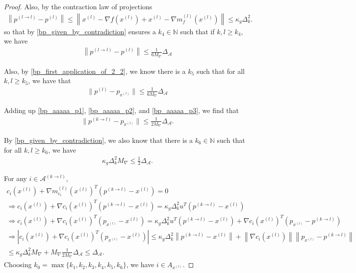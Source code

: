 \documentclass{article}
\theoremstyle{case}
\numberwithin{theorem}{subsection}
\newcommand{\dk}{\Delta_k}
\newcommand{\maxgrad}{{M_{\nabla}}}
\newcommand{\minactivegraddelta}{{\Delta_{\mathcal A}}}
\newcommand{\naturals}{\mathbb N}
\begin{document}
\begin{proof}
Also, by the contraction law of projections
\begin{align*}
\left\|p^{(l\to l)} - p^{(l)}\right\| 
\le \left\|x^{(l)} - \nabla f\left(x^{(l)}\right) + x^{(l)} - \nabla m_{f}^{(l)}\left(x^{(l)}\right)\right\|
\le \kappa_g \dk^2.
\end{align*}
so that by \cref{bp_given_by_contradiction} ensures a $k_4\in\naturals$ such that if $k, l \ge k_4$, we have
\begin{align}
\left\|p^{(l\to l)} - p^{(l)}\right\| \le \frac 1 {6\maxgrad} \minactivegraddelta \label{bp_aaaaa_p2}
\end{align}

Also, by \cref{bp_first_application_of_2_2}, we know there is a $k_5$ such that for all $k, l \ge k_5$, we have that
\begin{align}
\| p^{(l)} - p_{x^{(l)}} \| \le \frac 1 {6\maxgrad} \minactivegraddelta \label{bp_aaaaa_p3}
\end{align}

Adding up \cref{bp_aaaaa_p1}, \cref{bp_aaaaa_p2}, and \cref{bp_aaaaa_p3}, we find that
\begin{align*}
\| p^{(k\to l)} - p_{x^{(l)}} \| \le \frac 1 {2\maxgrad}\minactivegraddelta.
\end{align*}

By \cref{bp_given_by_contradiction}, we also know that there is a $k_6 \in \naturals$ such that for all $k, l \ge k_6$, we have
\begin{align*}
\kappa_g \dk^2 \maxgrad \le \frac 1 2 \minactivegraddelta.
\end{align*}



For any $i \in \mathcal A^{(k\to l)}$, 
\begin{align*}
c_i\left(x^{(l)}\right) + \nabla m_{c_i}^{(l)}\left(x^{(l)}\right)^T\left(p^{(k\to l)} - x^{(l)}\right) = 0 \\
\Longrightarrow c_i\left(x^{(l)}\right) + \nabla c_i\left(x^{(l)}\right)^T\left(p^{(k\to l)} - x^{(l)}\right) = \kappa_g \dk^2 u^T\left(p^{(k\to l)} - x^{(l)}\right) \\
\Longrightarrow c_i\left(x^{(l)}\right) + \nabla c_i\left(x^{(l)}\right)^T\left(p_{x^{(l)}} - x^{(l)}\right) 
= \kappa_g \dk^2 u^T\left(p^{(k\to l)} - x^{(l)}\right) + \nabla c_i\left(x^{(l)}\right)^T\left(p_{x^{(l)}} - p^{(k\to l)}\right)\\
\Longrightarrow \left|c_i\left(x^{(l)}\right) + \nabla c_i\left(x^{(l)}\right)^T\left(p_{x^{(l)}} - x^{(l)}\right) \right|
\le \kappa_g \dk^2 \left\|p^{(k\to l)} - x^{(l)}\right\| + \left\|\nabla c_i\left(x^{(l)}\right)\right\|\left\|p_{x^{(l)}} - p^{(k\to l)}\right\|\\
\le \kappa_g \dk^2 \maxgrad + \maxgrad \frac 1 {2\maxgrad}\minactivegraddelta \le \minactivegraddelta.
\end{align*}
Choosing $k_0 = \max\{k_1, k_2, k_3, k_4, k_5, k_6\}$, we have $i \in A_{x^{(l)}}$.
\end{proof}
\end{document}
